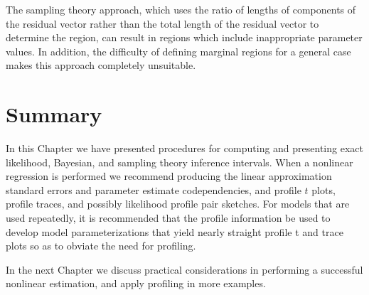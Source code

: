 The sampling theory approach, which uses the ratio of lengths of
components of the residual vector rather than the total length of
the residual vector to determine the region, can result in regions
which include inappropriate parameter values.
In addition, the difficulty of defining marginal regions for a
general case makes this approach completely unsuitable.

\section*{Summary}

In this Chapter we have presented 
procedures for computing and presenting exact likelihood, 
Bayesian, and sampling theory inference intervals.  
When a nonlinear regression is performed
we recommend producing the linear approximation
standard errors and parameter estimate codependencies, and profile $t$ plots, profile
traces, and possibly likelihood profile pair sketches.
For models that are used repeatedly, it is recommended that the profile
information be used to develop model parameterizations that yield
nearly straight profile t and trace plots so as to obviate the need for profiling.

In the next Chapter we discuss practical considerations in performing
a successful nonlinear estimation, and apply profiling in more examples.


